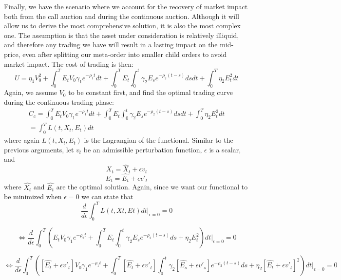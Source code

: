 \documentclass{article}
\begin{document}
Finally, we have the scenario where we account for the recovery of market impact both from the call auction and during the continuous auction. Although it will allow us to derive the most comprehensive solution, it is also the most complex one. The assumption is that the asset under consideration is relatively illiquid, and therefore any trading we have will result in a lasting impact on the mid-price, even after splitting our meta-order into smaller child orders to avoid market impact. The cost of trading is then:
\[
  U = \eta_1 V_0^2  + \int_0^T E_t V_0 \gamma_1 e^{-\rho_1 t} dt + \int_0^T E_t \int_0^t  \gamma_2 E_s e^{-\rho_2(t-s)} ds dt  + \int_0^T \eta_2 E_t^2 dt
\]
Again, we assume $V_0$ to be constant first, and find the optimal trading curve during the continuous trading phase:
\[
  \begin{aligned}
    C_c = \int_0^T E_t V_0 \gamma_1 e^{-\rho_1 t} dt + \int_0^T E_t \int_0^t  \gamma_2 E_s e^{-\rho_2(t-s)} ds dt  + \int_0^T \eta_2 E_t^2 dt \\
    = \int_0^T L(t, X_t,E_t) dt
  \end{aligned}
\]
where again $L(t, X_t,E_t)$ is the Lagrangian of the functional. Similar to the previous arguments, let $v_t$ be an admissible perturbation function, $\epsilon$ is a scalar, and
\[
  X_t = \hat{X}_t + \epsilon v_t
\]
\[
  E_t = \hat{E_t} + \epsilon {v'}_t
\]
where $\hat{X_t}$ and $\hat{E_t}$ are the optimal solution. Again, since we want our functional to be minimized when $\epsilon=0$ we can state that
\[
  \frac{d}{d\epsilon} \int_0^T L(t, Xt, Et) dt|_{\epsilon=0}=0
\]

\[
  \Leftrightarrow \frac{d}{d\epsilon} \int_0^T (E_t V_0 \gamma_1 e^{-\rho_2 t} + \int_0^T E_t \int_0^t  \gamma_2 E_s e^{-\rho_2(t-s)} ds + \eta_2 E_t^2) dt|_{\epsilon=0}=0
\]

\[
  \Leftrightarrow \frac{d}{d\epsilon} \int_0^T ( [\hat{E_t} + \epsilon {v'}_t] V_0 \gamma_1 e^{-\rho_1 t} + \int_0^T [\hat{E_t} + \epsilon {v'}_t] \int_0^t  \gamma_2 [\hat{E_s} + \epsilon {v'}_s] e^{-\rho_2(t-s)} ds + \eta_2 [\hat{E_t} + \epsilon {v'}_t]^2) dt|_{\epsilon=0}=0
\]
\end{document}
